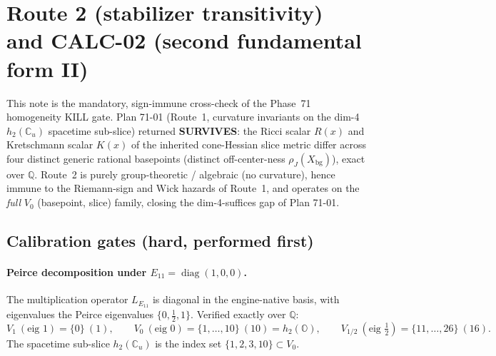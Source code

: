 %

\section{Route 2 (stabilizer transitivity) and CALC-02 (second fundamental form II)}
\label{sec:71-homogeneity-stabilizer}

This note is the mandatory, sign-immune cross-check of the Phase~71 homogeneity
KILL gate. Plan 71-01 (Route~1, curvature invariants on the dim-4 $h_2(\mathbb{C}_u)$
spacetime sub-slice) returned \textbf{SURVIVES}: the Ricci scalar $R(x)$ and
Kretschmann scalar $K(x)$ of the inherited cone-Hessian slice metric differ across
four distinct generic rational basepoints (distinct off-center-ness
$\rho_J(X_{\mathrm{bg}})$), exact over $\mathbb{Q}$. Route~2 is purely
group-theoretic / algebraic (no curvature), hence immune to the Riemann-sign and
Wick hazards of Route~1, and operates on the \emph{full} $V_0$ (basepoint, slice)
family, closing the dim-4-suffices gap of Plan 71-01.

\subsection{Calibration gates (hard, performed first)}

\paragraph{Peirce decomposition under $E_{11}=\operatorname{diag}(1,0,0)$.}
The multiplication operator $L_{E_{11}}$ is diagonal in the engine-native basis,
with eigenvalues the Peirce eigenvalues $\{0,\tfrac12,1\}$. Verified exactly over
$\mathbb{Q}$:
\[
V_1\ (\text{eig }1) = \{0\}\ (1),\qquad
V_0\ (\text{eig }0) = \{1,\dots,10\}\ (10) = h_2(\mathbb{O}),\qquad
V_{1/2}\ (\text{eig }\tfrac12) = \{11,\dots,26\}\ (16).
\]
The spacetime sub-slice $h_2(\mathbb{C}_u)$ is the index set $\{1,2,3,10\}\subset V_0$.

